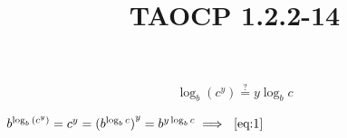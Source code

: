 \documentclass{article}
\title{TAOCP 1.2.2\mbox{-}14}
\begin{document}
\maketitle

\[\log_{b}(c^{y}) \overset{?}{=} y \log_{b} c \tag{1}\label{eq:1}\]

\( b^{\log_b{(c^{y})}} = c^{y} = {(b^{\log_b{c}})}^{y} = b^{y \log_b{c}} \implies~\eqref{eq:1} \)
\end{document}
